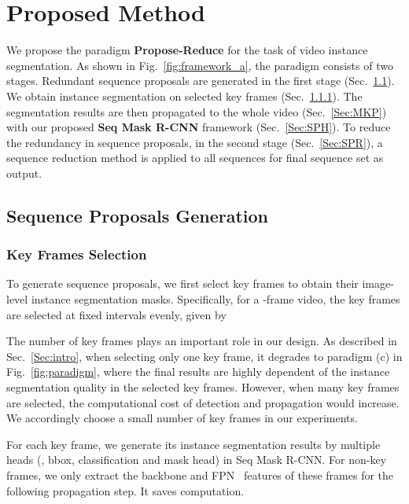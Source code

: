 \documentclass[10pt,twocolumn,letterpaper]{article}
\begin{document}
	
	\section{Proposed Method}
	
	We propose the paradigm \textbf{Propose-Reduce} for the task of video instance segmentation. As shown in Fig.~\ref{fig:framework_a}, the paradigm consists of two stages. Redundant sequence proposals are generated in the first stage (Sec.~\ref{Sec:SPG}). We obtain instance segmentation on  selected key frames (Sec.~\ref{Sec:KFS}). The segmentation results are then propagated to the whole video (Sec.~\ref{Sec:MKP}) with our proposed \textbf{Seq Mask R-CNN} framework (Sec.~\ref{Sec:SPH}).
	To reduce the redundancy in sequence proposals, in the second stage (Sec.~\ref{Sec:SPR}), a sequence reduction method is applied to all sequences for final sequence set as output. 
	
	
	\subsection{Sequence Proposals Generation}\label{Sec:SPG}
	\subsubsection{Key Frames Selection}\label{Sec:KFS}
	To generate sequence proposals, we first select  key frames to obtain their image-level instance segmentation masks. Specifically, for a -frame video, the  key frames  are selected at fixed intervals evenly, given by
	
	The number of key frames plays an important role in our design. 
	As described in Sec.~\ref{Sec:intro}, when selecting only one key frame, it degrades to paradigm (c) in Fig.~\ref{fig:paradigm}, where the final results are highly dependent of the instance segmentation quality in the selected key frames.
	However, when many key frames are selected, the computational cost of detection and propagation would increase.
	We accordingly choose a small number of key frames in our experiments. 
	
	For each key frame, we generate its instance segmentation results by multiple heads (\ie, bbox, classification and mask head) in Seq Mask R-CNN. For non-key frames, we only extract the backbone and FPN~\cite{lin2017feature} features of these frames for the following propagation step.
	It saves computation. 
	
\end{document}
